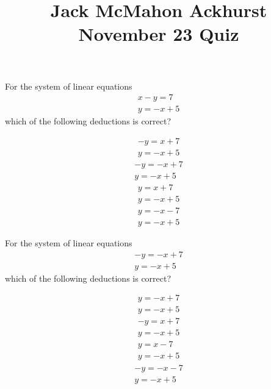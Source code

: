 \documentclass{webquiz}
\title{Jack McMahon Ackhurst November 23 Quiz}
\begin{document}
\begin{question} %
For the system of linear equations
\begin{gather*} 
x-y=7\\
y=-x+5
\end{gather*}
which of the following deductions is correct?
\begin{choice}[columns=1] %
\incorrect
\begin{gather*} 
-y=x+7\\
y=-x+5
\end{gather*}
\correct
\begin{gather*} 
-y=-x+7\\
y=-x+5
\end{gather*}
\incorrect
\begin{gather*} 
y=x+7\\
y=-x+5
\end{gather*}
\incorrect
\begin{gather*} 
y=-x-7\\
y=-x+5
\end{gather*}
\end{choice}
\end{question}



\begin{question} %
For the system of linear equations
\begin{gather*} 
-y=-x+7\\
y=-x+5
\end{gather*}
which of the following deductions is correct?
\begin{choice}[columns=1] %
\incorrect
\begin{gather*} 
y=-x+7\\
y=-x+5
\end{gather*}
\incorrect
\begin{gather*} 
-y=x+7\\
y=-x+5
\end{gather*}
\correct
\begin{gather*} 
y=x-7\\
y=-x+5
\end{gather*}
\incorrect
\begin{gather*} 
-y=-x-7\\
y=-x+5
\end{gather*}
\end{choice}
\end{question}
\end{document}
